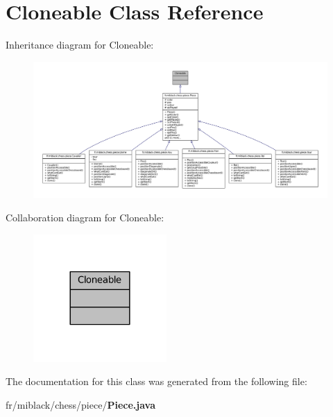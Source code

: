 \section{Cloneable Class Reference}
\label{classCloneable}


Inheritance diagram for Cloneable\-:
\nopagebreak
\begin{figure}[H]
\begin{center}
\leavevmode
\includegraphics[width=350pt]{classCloneable__inherit__graph}
\end{center}
\end{figure}


Collaboration diagram for Cloneable\-:
\nopagebreak
\begin{figure}[H]
\begin{center}
\leavevmode
\includegraphics[width=144pt]{classCloneable__coll__graph}
\end{center}
\end{figure}


The documentation for this class was generated from the following file\-:\begin{DoxyCompactItemize}
\item 
fr/miblack/chess/piece/{\bf Piece.\-java}\end{DoxyCompactItemize}
